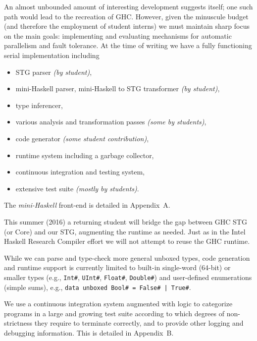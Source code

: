 \documentclass{llncs}
\begin{document}
An almost unbounded amount of interesting development suggests itself; one
such path would lead to the recreation of GHC.  However, given the minuscule
budget (and therefore the employment of student interns) we must maintain
sharp focus on the main goals: implementing and evaluating mechanisms for
automatic parallelism and fault tolerance.  At the time of writing we have a
fully functioning serial implementation including
\begin{itemize}
\item STG parser \emph{(by student)},
\item mini-Haskell parser, mini-Haskell to STG transformer \emph{(by student)},
\item type inferencer,
\item various analysis and transformation passes \emph{(some by students)},
\item code generator \emph{(some student contribution)},
\item runtime system including a garbage collector,
\item continuous integration and testing system,
\item extensive test suite \emph{(mostly by students)}.
\end{itemize}

The \emph{mini-Haskell} front-end is detailed in Appendix~A.

This summer (2016) a returning student will bridge the gap between GHC STG (or
Core) and our STG, augmenting the runtime as needed.  Just as in the Intel
Haskell Research Compiler effort we will not attempt to reuse the GHC runtime.

While we can parse and type-check more general unboxed types, code generation
and runtime support is currently limited to built-in single-word (64-bit) or
smaller types (e.g., \texttt{Int\#}, \texttt{UInt\#}, \texttt{Float\#},
\texttt{Double\#}) and user-defined enumerations (simple sums), e.g.,
\texttt{data unboxed Bool\# = False\# | True\#}.

We use a continuous integration system augmented with logic to categorize
programs in a large and growing test suite according to which degrees of
non-strictness they require to terminate correctly, and to provide other
logging and debugging information.  This is detailed in Appendix~B.

\end{document}
